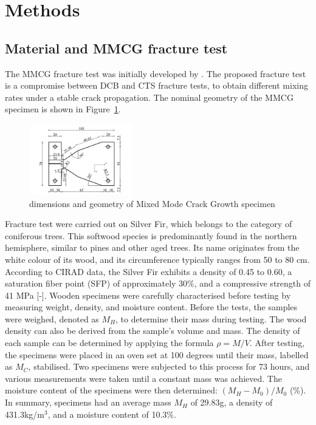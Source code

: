 \documentclass[3p,times,procedia]{elsarticle}
\begin{document}
\section{Methods}\label{S:method}

\subsection{Material and MMCG fracture test}\label{Ss:spec}

The MMCG fracture test was initially developed by \citet{MoutouPitti2008}. The proposed fracture test is a compromise between DCB and CTS fracture tests, to obtain different mixing rates under a stable crack propagation. The nominal geometry of the MMCG specimen is shown in Figure~\ref{fig:Fig5}.

\begin{figure}[th]
	\centering
	\includegraphics[width=0.4\textwidth]{Figures/fig23}
	\caption[MMCG specimen]{dimensions and geometry of Mixed Mode Crack Growth specimen}
	\label{fig:Fig5}
\end{figure}

Fracture test were carried out on Silver Fir, which belongs to the category of coniferous trees. This softwood species is predominantly found in the northern hemisphere, similar to pines and other aged trees. Its name originates from the white colour of its wood, and its circumference typically ranges from 50 to 80 cm. According to CIRAD data, the Silver Fir exhibits a density of 0.45 to 0.60, a saturation fiber point (SFP) of approximately 30\%, and a compressive strength of 41 MPa [-].
Wooden specimens were carefully characterised before testing by measuring weight, density, and moisture content. Before the tests, the samples were weighed, denoted as $M_H$, to determine their mass during testing. The wood density can also be derived from the sample's volume and mass. The density of each sample can be determined by applying the formula $\rho = M/V$.
After testing, the specimens were placed in an oven set at 100 degrees until their mass, labelled as $M_C$, stabilised. Two specimens were subjected to this process for 73 hours, and various measurements were taken until a constant mass was achieved. The moisture content of the specimens were then determined: $(M_{H}-M_{0})/M_{0}$ (\%). In summary, specimens had an average mass $M_H$ of 29.83g, a density of 431.3kg/m$^3$, and a moisture content of 10.3\%.
\end{document}
